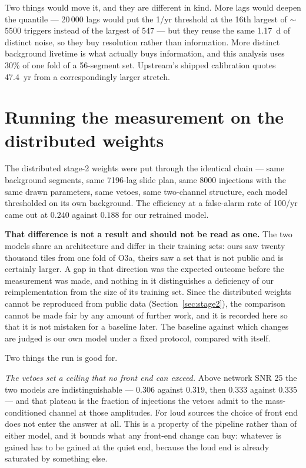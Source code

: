 \documentclass[11pt]{article}
\begin{document}
Two things would move it, and they are different in kind. More lags would deepen the
quantile --- 20\,000 lags would put the 1/yr threshold at the 16th largest of $\sim$5500
triggers instead of the largest of 547 --- but they reuse the same 1.17~d of distinct
noise, so they buy resolution rather than information. More distinct background livetime
is what actually buys information, and this analysis uses 30\% of one fold of a
56-segment set. Upstream's shipped calibration quotes 47.4~yr from a correspondingly
larger stretch.

\section{Running the measurement on the distributed weights}
\label{sec:headtohead}

The distributed stage-2 weights were put through the identical chain --- same background
segments, same 7196-lag slide plan, same 8000 injections with the same drawn parameters,
same vetoes, same two-channel structure, each model thresholded on its own background.
The efficiency at a false-alarm rate of 100/yr came out at $0.240$ against $0.188$ for
our retrained model.

\textbf{That difference is not a result and should not be read as one.} The two models
share an architecture and differ in their training sets: ours saw twenty thousand tiles
from one fold of O3a, theirs saw a set that is not public and is certainly larger. A gap
in that direction was the expected outcome before the measurement was made, and nothing
in it distinguishes a deficiency of our reimplementation from the size of its training
set. Since the distributed weights cannot be reproduced from public data
(Section~\ref{sec:stage2}), the comparison cannot be made fair by any amount of further
work, and it is recorded here so that it is not mistaken for a baseline later. The
baseline against which changes are judged is our own model under a fixed protocol,
compared with itself.

Two things the run is good for.

\emph{The vetoes set a ceiling that no front end can exceed.} Above network SNR 25 the
two models are indistinguishable --- $0.306$ against $0.319$, then $0.333$ against
$0.335$ --- and that plateau is the fraction of injections the vetoes admit to the
mass-conditioned channel at those amplitudes. For loud sources the choice of front end
does not enter the answer at all. This is a property of the pipeline rather than of
either model, and it bounds what any front-end change can buy: whatever is gained has to
be gained at the quiet end, because the loud end is already saturated by something else.
\end{document}
